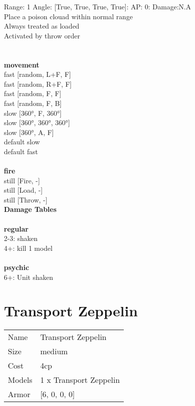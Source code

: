 Range: 1  Angle: [True, True, True, True]: AP: 0: Damage:N.A \\
Place a poison clouad within normal range\\ 
Always treated as loaded\\ 
Activated by throw order\\ 




 
\ \\



\ \\ {\bf movement } \\
fast [random, L+F, F] \\
fast [random, R+F, F] \\
fast [random, F, F] \\
fast [random, F, B] \\
slow [360°, F, 360°] \\
slow [360°, 360°, 360°] \\
slow [360°, A, F] \\
default slow \\
default fast \\
\ \\ {\bf fire } \\
still [Fire, -] \\
still [Load, -] \\
still [Throw, -] \\


{\bf Damage Tables} \\
\ \\ {\bf regular } \\
2-3: shaken \\
4+: kill 1 model \\
\ \\ {\bf psychic } \\
6+: Unit shaken \\










\pagebreak\pagebreak

\section{ Transport Zeppelin }

\begin{tabular}{ll}
  Name & Transport Zeppelin \\
  Size & medium\\
  Cost & 4cp\\
  Models & 1 x Transport Zeppelin\\
  Armor & [6, 0, 0, 0]\\
\end{tabular}

